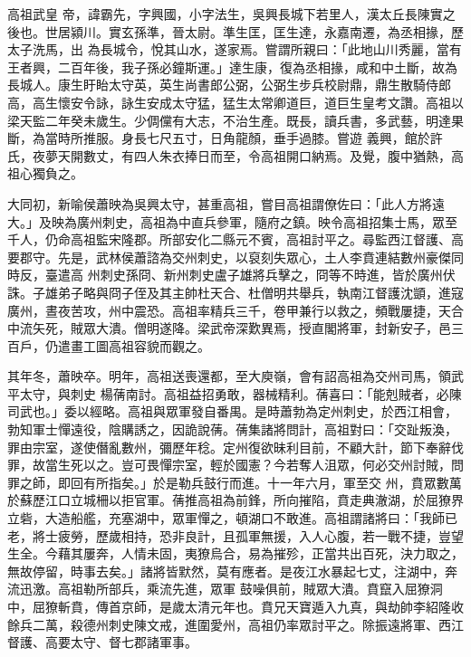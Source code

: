 
\begin{pinyinscope}

 高祖武皇
 帝，諱霸先，字興國，小字法生，吳興長城下若里人，漢太丘長陳實之後也。世居潁川。實玄孫準，晉太尉。準生匡，匡生達，永嘉南遷，為丞相掾，歷太子洗馬，出
 為長城令，悅其山水，遂家焉。嘗謂所親曰：「此地山川秀麗，當有王者興，二百年後，我子孫必鐘斯運。」達生康，復為丞相掾，咸和中土斷，故為長城人。康生盱眙太守英，英生尚書郎公弼，公弼生步兵校尉鼎，鼎生散騎侍郎高，高生懷安令詠，詠生安成太守猛，猛生太常卿道巨，道巨生皇考文讚。高祖以梁天監二年癸未歲生。少倜儻有大志，不治生產。既長，讀兵書，多武藝，明達果斷，為當時所推服。身長七尺五寸，日角龍顏，垂手過膝。嘗遊
 義興，館於許氏，夜夢天開數丈，有四人朱衣捧日而至，令高祖開口納焉。及覺，腹中猶熱，高祖心獨負之。



 大同初，新喻侯蕭映為吳興太守，甚重高祖，嘗目高祖謂僚佐曰：「此人方將遠大。」及映為廣州刺史，高祖為中直兵參軍，隨府之鎮。映令高祖招集士馬，眾至千人，仍命高祖監宋隆郡。所部安化二縣元不賓，高祖討平之。尋監西江督護、高要郡守。先是，武林侯蕭諮為交州刺史，以裒刻失眾心，土人李賁連結數州豪傑同時反，臺遣高
 州刺史孫冏、新州刺史盧子雄將兵擊之，冏等不時進，皆於廣州伏誅。子雄弟子略與冏子侄及其主帥杜天合、杜僧明共舉兵，執南江督護沈顗，進寇廣州，晝夜苦攻，州中震恐。高祖率精兵三千，卷甲兼行以救之，頻戰屢捷，天合中流矢死，賊眾大潰。僧明遂降。梁武帝深歎異焉，授直閣將軍，封新安子，邑三百戶，仍遣畫工圖高祖容貌而觀之。



 其年冬，蕭映卒。明年，高祖送喪還都，至大庾嶺，會有詔高祖為交州司馬，領武平太守，與刺史
 楊蒨南討。高祖益招勇敢，器械精利。蒨喜曰：「能剋賊者，必陳司武也。」委以經略。高祖與眾軍發自番禺。是時蕭勃為定州刺史，於西江相會，勃知軍士憚遠役，陰購誘之，因詭說蒨。蒨集諸將問計，高祖對曰：「交趾叛渙，罪由宗室，遂使僭亂數州，彌歷年稔。定州復欲昧利目前，不顧大計，節下奉辭伐罪，故當生死以之。豈可畏憚宗室，輕於國憲？今若奪人沮眾，何必交州討賊，問罪之師，即回有所指矣。」於是勒兵鼓行而進。十一年六月，軍至交
 州，賁眾數萬於蘇歷江口立城柵以拒官軍。蒨推高祖為前鋒，所向摧陷，賁走典澈湖，於屈獠界立砦，大造船艦，充塞湖中，眾軍憚之，頓湖口不敢進。高祖謂諸將曰：「我師已老，將士疲勞，歷歲相持，恐非良計，且孤軍無援，入人心腹，若一戰不捷，豈望生全。今藉其屢奔，人情未固，夷獠烏合，易為摧殄，正當共出百死，決力取之，無故停留，時事去矣。」諸將皆默然，莫有應者。是夜江水暴起七丈，注湖中，奔流迅激。高祖勒所部兵，乘流先進，眾軍
 鼓噪俱前，賊眾大潰。賁竄入屈獠洞中，屈獠斬賁，傳首京師，是歲太清元年也。賁兄天寶遁入九真，與劫帥李紹隆收餘兵二萬，殺德州刺史陳文戒，進圍愛州，高祖仍率眾討平之。除振遠將軍、西江督護、高要太守、督七郡諸軍事。




\end{pinyinscope}
